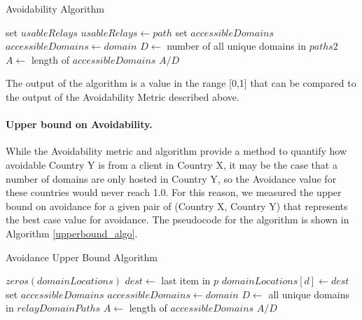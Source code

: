 \begin{algorithm}[t]
\caption{Avoidability Algorithm}
\label{avoid_algo}
\small
\begin{algorithmic}[1]
    \State set $usableRelays$
		\State $usableRelays \gets path$
	\EndIf
    \EndFor
    \State set $accessibleDomains$
        \State $accessibleDomains \gets domain$
        \EndIf
    \EndIf
    \EndFor
    \State $D \gets$ number of all unique domains in $paths2$
    \State $A \gets$ length of $accessibleDomains$
    \State \Return $A / D$
\EndFunction
\end{algorithmic}
\end{algorithm}

The output of the algorithm is a value in the range [0,1] that can be compared to the output of the Avoidability Metric described above.  

\paragraph{Upper bound on Avoidability.}  While the Avoidability metric and algorithm provide a method to quantify how avoidable Country Y is from a client in Country X, it may be the case that a number of domains are only hosted in Country Y, so the Avoidance value for these countries would never reach 1.0.  For this reason, we measured the upper bound on avoidance for a given pair of (Country X, Country Y) that represents the best case value for avoidance.  The pseudocode for the algorithm is shown in Algorithm \ref{upperbound_algo}.

\begin{algorithm}[t]
\caption{Avoidance Upper Bound Algorithm}
\label{upperbound_algo}
\small
\begin{algorithmic}[1]
    \State $zeros(domainLocations)$
		\State $dest \gets $ last item in $p$
		\State $domainLocations[d] \gets dest$
    \EndFor
    \State set $accessibleDomains$
    \State $accessibleDomains \gets domain$
    \EndIf
    \EndFor
    \State $D \gets$ all unique domains in  $relayDomainPaths$
    \State $A \gets$ length of $accessibleDomains$
    \State \Return $A / D$
\EndFunction
\end{algorithmic}
\end{algorithm}

